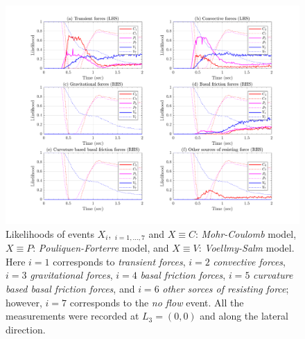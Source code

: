 \documentclass{article}
\begin{document}
\begin{figure}[H]
        \centering
        \includegraphics[width=1\textwidth]{InclinedPlane/LocalRecords/DominancePrY_L3.png}
        \caption{Likelihoods of events $X_i, \ _{i=1,...,7}$ and $X \equiv C$: \emph{Mohr-Coulomb} model, $X \equiv P$: \emph{Pouliquen-Forterre} model, and $X \equiv V$: \emph{Voellmy-Salm} model. Here $i=1$ corresponds to \emph{transient forces}, $i=2$ \emph{convective forces}, $i=3$ \emph{gravitational forces}, $i=4$ \emph{basal friction forces}, $i=5$ \emph{curvature based basal friction forces}, and $i=6$ \emph{other sorces of resisting force}; however, $i=7$ corresponds to the \emph{no flow} event. All the measurements were recorded at $L_3=(0,0)$ and along the lateral direction.}
        \label{fig:Ramp-FXDominance-L3}
\end{figure}
\end{document}
